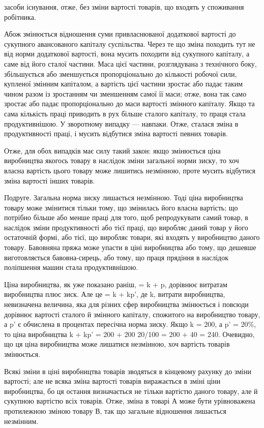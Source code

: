 засоби існування, отже, без зміни вартості товарів, що входять у споживання робітника.

Абож змінюється відношення суми привласнюваної додаткової вартості до сукупного авансованого
капіталу суспільства. Через те що зміна походить тут не від норми додаткової вартості, вона мусить
походити від сукупного капіталу, а саме від його сталої частини. Маса цієї частини, розглядувана з
технічного боку, збільшується або зменшується пропорціонально до кількості робочої сили, купленої
змінним капіталом, а вартість цієї частини зростає або падає таким чином разом із зростанням чи
зменшенням самої її маси; отже, вона так само зростає або падає пропорціонально до маси вартості
змінного капіталу. Якщо та сама кількість праці приводить в рух більше сталого капіталу, то праця
стала продуктивнішою. У зворотному випадку — навпаки. Отже, сталася зміна в продуктивності праці, і
мусить відбутися зміна вартості певних товарів.

Отже, для обох випадків має силу такий закон: якщо змінюється ціна виробництва якогось товару в
наслідок зміни загальної норми зиску, то хоч власна вартість цього товару може лишитись незмінною,
проте мусить відбутися зміна вартості інших товарів.

 Подруге. Загальна норма зиску лишається незмінною. Тоді ціна виробництва товару може змінитися
тільки тому, що змінилась його власна вартість; що потрібно більше або менше праці для того, щоб
репродукувати самий товар, в наслідок зміни продуктивності або тієї праці, що виробляє даний товар у
його остаточній формі, або тієї, що виробляє товари, які входять у виробництво даного товару.
Бавовняна пряжа може упасти в ціні виробництва або тому, що дешевше виготовляється бавовна-сирець,
або тому, що праця прядіння в наслідок поліпшення машин стала продуктивнішою.

Ціна виробництва, як уже показано раніш, = k + p, дорівнює витратам виробництва плюс зиск. Але це =
k + kp', де k, витрати виробництва, невизначена величина, яка для різних сфер виробництва змінюється
і повсюди дорівнює вартості сталого й змінного капіталу, спожитого на виробництво товару, а p' є
обчислена в процентах пересічна норма зиску. Якщо k = 200, а p' = 20\%, то ціна виробництва k + kp' =
200 + 200 20/100 = 200
+ 40 = 240. Очевидно, що ця ціна виробництва може лишатися незмінною, хоч вартість товарів
змінюється.

Всякі зміни в ціні виробництва товарів зводяться в кінцевому рахунку до зміни вартості; але не всяка
зміна вартості товарів виражається в зміні ціни виробництва, бо ця остання визначається не тільки
вартістю даного товару, але й сукупною вартістю всіх товарів. Отже, зміна в товарі А може бути
урівноважена протилежною зміною товару В, так що загальне відношення лишається незмінним.
